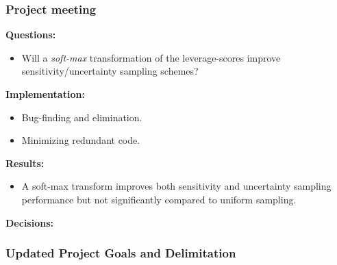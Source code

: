 \documentclass[11pt, a4paper]{article} %
\begin{document}
\subsubsection*{Project meeting}
\textbf{Questions:}\\
\begin{itemize}
\item Will a \emph{soft-max} transformation of the leverage-scores improve sensitivity/uncertainty sampling schemes?
\end{itemize}

\textbf{Implementation:}\\
\begin{itemize}
\item Bug-finding and elimination.
\item Minimizing redundant code.
\end{itemize}

\textbf{Results:}\\
\begin{itemize}
\item A soft-max transform improves both sensitivity and uncertainty sampling performance but not significantly compared to uniform sampling. 
\end{itemize}

\textbf{Decisions:}\\
\subsubsection*{Updated Project Goals and Delimitation}
\end{document}
